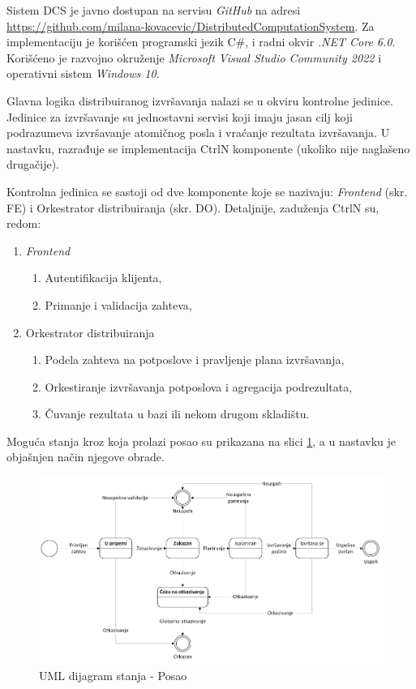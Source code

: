 \documentclass[12pt,oneside]{memoir}
\begin{document}
Sistem DCS je javno dostupan na servisu \emph{GitHub} na adresi \href{https://github.com/milana-kovacevic/DistributedComputationSystem}{https://github.com/milana-kovacevic/DistributedComputationSystem}\label{githubdcs}. Za implementaciju je korišćen programski jezik C\#, i radni okvir \emph{.NET Core 6.0}. Korišćeno je razvojno okruženje \emph{Microsoft Visual Studio Community 2022} i operativni sistem \emph{Windows 10}.

Glavna logika distribuiranog izvršavanja nalazi se u okviru kontrolne jedinice. Jedinice za izvršavanje su jednostavni servisi koji imaju jasan cilj koji podrazumeva izvršavanje atomičnog posla i vraćanje rezultata izvršavanja. U nastavku, razrađuje se implementacija CtrlN komponente (ukoliko nije naglašeno drugačije).

Kontrolna jedinica se sastoji od dve komponente koje se nazivaju: \emph{Frontend} (skr. FE) i Orkestrator distribuiranja (skr. DO). Detaljnije, zaduženja CtrlN su, redom:
\begin{enumerate}
\item \emph{Frontend}
	\begin{enumerate}
	\item Autentifikacija klijenta,
	\item Primanje i validacija zahteva,
	\end{enumerate}
\item Orkestrator distribuiranja
	\begin{enumerate}
	\item \label{podela_planiranje}Podela zahteva na potposlove i pravljenje plana izvršavanja,
	\item \label{orkestriranje}Orkestiranje izvršavanja potposlova i agregacija podrezultata,
	\item \label{cuvanje_u_bazi}Čuvanje rezultata u bazi ili nekom drugom skladištu.
	\end{enumerate}
\end{enumerate}

Moguća stanja kroz koja prolazi posao su prikazana na slici \ref{fig:stanjaposla}, a u nastavku je objašnjen način njegove obrade.

\begin{figure}[!ht]
  \centering
  \includegraphics[width=1.0\textwidth]{./images/dijagram_stanja_posao.png}
  \caption{UML dijagram stanja - Posao}
  \label{fig:stanjaposla}
\end{figure}
\end{document}
